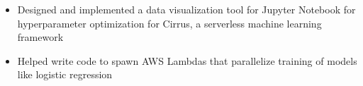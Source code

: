 \documentclass{res}
\begin{document}
\begin{resume}
\begin{itemize}
            \item Designed and implemented a data visualization tool for Jupyter Notebook for hyperparameter optimization for Cirrus, a serverless machine learning framework
            \item Helped write code to spawn AWS Lambdas that parallelize training of models like logistic regression
        \end{itemize}
		\vspace{-10pt}

\end{resume}
\end{document}
